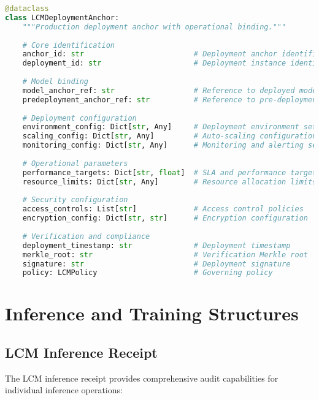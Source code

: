 \documentclass[12pt,a4paper]{article}
\begin{document}
\begin{lstlisting}[language=Python, caption=Deployment Anchor Structure]
@dataclass
class LCMDeploymentAnchor:
    """Production deployment anchor with operational binding."""
    
    # Core identification
    anchor_id: str                         # Deployment anchor identifier
    deployment_id: str                     # Deployment instance identifier
    
    # Model binding
    model_anchor_ref: str                  # Reference to deployed model
    predeployment_anchor_ref: str          # Reference to pre-deployment validation
    
    # Deployment configuration
    environment_config: Dict[str, Any]     # Deployment environment settings
    scaling_config: Dict[str, Any]         # Auto-scaling configuration
    monitoring_config: Dict[str, Any]      # Monitoring and alerting setup
    
    # Operational parameters
    performance_targets: Dict[str, float]  # SLA and performance targets
    resource_limits: Dict[str, Any]        # Resource allocation limits
    
    # Security configuration
    access_controls: List[str]             # Access control policies
    encryption_config: Dict[str, str]      # Encryption configuration
    
    # Verification and compliance
    deployment_timestamp: str              # Deployment timestamp
    merkle_root: str                       # Verification Merkle root
    signature: str                         # Deployment signature
    policy: LCMPolicy                      # Governing policy
\end{lstlisting}

\section{Inference and Training Structures}

\subsection{LCM Inference Receipt}

The LCM inference receipt provides comprehensive audit capabilities for individual inference operations:
\end{document}
